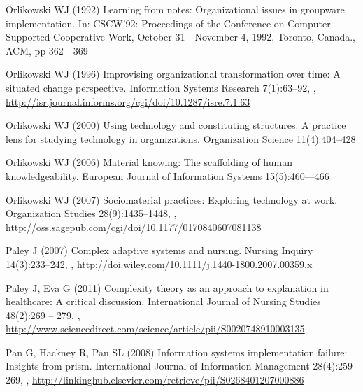 \documentclass{article}
\begin{document}
\begin{thebibliography}{193}
Orlikowski WJ (1992{}) Learning from notes: Organizational issues
  in groupware implementation. In: {CSCW'92:} Proceedings of the Conference on
  Computer Supported Cooperative Work, October 31 - November 4, 1992, Toronto,
  Canada., {ACM}, pp 362---369

Orlikowski WJ (1996) Improvising organizational transformation over time: A
  situated change perspective. Information Systems Research 7(1):63--92,
  ,
  \urlprefix\url{http://isr.journal.informs.org/cgi/doi/10.1287/isre.7.1.63}

Orlikowski WJ (2000) Using technology and constituting structures: A practice
  lens for studying technology in organizations. Organization Science
  11(4):404--428

Orlikowski WJ (2006) Material knowing: The scaffolding of human
  knowledgeability. European Journal of Information Systems 15(5):460---466

Orlikowski WJ (2007) Sociomaterial practices: Exploring technology at work.
  Organization Studies 28(9):1435--1448, ,
  \urlprefix\url{http://oss.sagepub.com/cgi/doi/10.1177/0170840607081138}

Paley J (2007) Complex adaptive systems and nursing. Nursing Inquiry
  14(3):233--242, ,
  \urlprefix\url{http://doi.wiley.com/10.1111/j.1440-1800.2007.00359.x}

Paley J, Eva G (2011) Complexity theory as an approach to explanation in
  healthcare: A critical discussion. International Journal of Nursing Studies
  48(2):269 -- 279, ,
  \urlprefix\url{http://www.sciencedirect.com/science/article/pii/S0020748910003135}

Pan G, Hackney R, Pan SL (2008) Information systems implementation failure:
  Insights from prism. International Journal of Information Management
  28(4):259--269, ,
  \urlprefix\url{http://linkinghub.elsevier.com/retrieve/pii/S0268401207000886}


\end{thebibliography}
\end{document}
